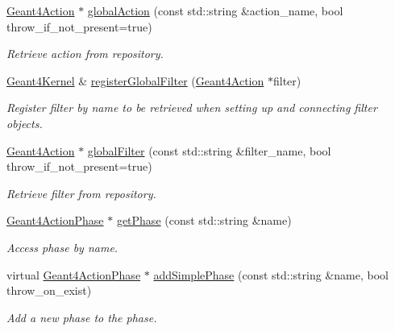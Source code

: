 \begin{DoxyCompactItemize}
\hyperlink{class_d_d4hep_1_1_simulation_1_1_geant4_action}{Geant4\+Action} $\ast$ \hyperlink{class_d_d4hep_1_1_simulation_1_1_geant4_kernel_a9142233acf94a391ef926eee86b04c26}{global\+Action} (const std\+::string \&action\+\_\+name, bool throw\+\_\+if\+\_\+not\+\_\+present=true)
\begin{DoxyCompactList}\small\item\em Retrieve action from repository. \end{DoxyCompactList}\item 
\hyperlink{class_d_d4hep_1_1_simulation_1_1_geant4_kernel}{Geant4\+Kernel} \& \hyperlink{class_d_d4hep_1_1_simulation_1_1_geant4_kernel_a0690ca4b44a14133f0c8562eebac9613}{register\+Global\+Filter} (\hyperlink{class_d_d4hep_1_1_simulation_1_1_geant4_action}{Geant4\+Action} $\ast$filter)
\begin{DoxyCompactList}\small\item\em Register filter by name to be retrieved when setting up and connecting filter objects. \end{DoxyCompactList}\item 
\hyperlink{class_d_d4hep_1_1_simulation_1_1_geant4_action}{Geant4\+Action} $\ast$ \hyperlink{class_d_d4hep_1_1_simulation_1_1_geant4_kernel_ad6b6f410f168992639e4fe3fa9fc2c73}{global\+Filter} (const std\+::string \&filter\+\_\+name, bool throw\+\_\+if\+\_\+not\+\_\+present=true)
\begin{DoxyCompactList}\small\item\em Retrieve filter from repository. \end{DoxyCompactList}\item 
\hyperlink{class_d_d4hep_1_1_simulation_1_1_geant4_action_phase}{Geant4\+Action\+Phase} $\ast$ \hyperlink{class_d_d4hep_1_1_simulation_1_1_geant4_kernel_ada608fd803fba670ab573da9a7a012eb}{get\+Phase} (const std\+::string \&name)
\begin{DoxyCompactList}\small\item\em Access phase by name. \end{DoxyCompactList}\item 
virtual \hyperlink{class_d_d4hep_1_1_simulation_1_1_geant4_action_phase}{Geant4\+Action\+Phase} $\ast$ \hyperlink{class_d_d4hep_1_1_simulation_1_1_geant4_kernel_ad6e24016ebe31a06417ffac7f6e93818}{add\+Simple\+Phase} (const std\+::string \&name, bool throw\+\_\+on\+\_\+exist)
\begin{DoxyCompactList}\small\item\em Add a new phase to the phase. \end{DoxyCompactList}\item 

\end{DoxyCompactItemize}
